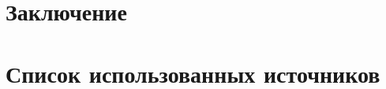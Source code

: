 \documentclass[
    numbers=section,
    document-code={ВКРБ--09.03.04--10.19--XX--26--81}
]{../latex/fqw}
\providecommand{\hl}[1]{#1}
\begin{document}
    \section*{Заключение}\label{sec:сonclusion}

    \hl{}

    \hl{}

    \hl{\hfill\break
    }


    \section*{Список использованных
    источников}\label{ux441ux43fux438ux441ux43eux43a-ux438ux441ux43fux43eux43bux44cux437ux43eux432ux430ux43dux43dux44bux445-ux438ux441ux442ux43eux447ux43dux438ux43aux43eux432}

    \hl{}
\end{document}
